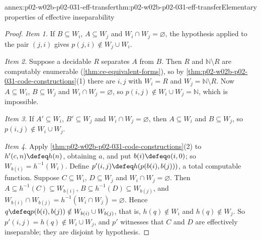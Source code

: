 \begin{annexitem}{annex:p02-w02b-p02-031-eff-transfer}{thm:p02-w02b-p02-031-eff-transfer}{Elementary properties of effective inseparability}
\begin{proof}
\emph{Item 1.}  If \(B\subseteq W_i\), \(A\subseteq W_j\) and \(W_i\cap
W_j=\varnothing\), the hypothesis applied to the pair \((j,i)\) gives
\(p(j,i)\notin W_j\cup W_i\).

\emph{Item 2.}  Suppose a decidable \(R\) separates \(A\) from \(B\).  Then
\(R\) and \(\mathbb N\setminus R\) are computably enumerable
(\cref{thm:ce-equivalent-forms}), so by
\cref{thm:p02-w02b-p02-031-code-constructions}(1) there are \(i,j\) with
\(W_i=R\) and \(W_j=\mathbb N\setminus R\).  Now \(A\subseteq W_i\),
\(B\subseteq W_j\) and \(W_i\cap W_j=\varnothing\), so
\(p(i,j)\notin W_i\cup W_j=\mathbb N\), which is impossible.

\emph{Item 3.}  If \(A'\subseteq W_i\), \(B'\subseteq W_j\) and \(W_i\cap
W_j=\varnothing\), then \(A\subseteq W_i\) and \(B\subseteq W_j\), so
\(p(i,j)\notin W_i\cup W_j\).

\emph{Item 4.}  Apply \cref{thm:p02-w02b-p02-031-code-constructions}(2) to
\(h'(c,n)\defeq h(n)\), obtaining \(a\), and put \(b(i)\defeq a(i,0)\); so
\(W_{b(i)}=h^{-1}(W_i)\).  Define \(p'(i,j)\defeq h(p(b(i),b(j)))\), a total
computable function.  Suppose \(C\subseteq W_i\), \(D\subseteq W_j\) and
\(W_i\cap W_j=\varnothing\).  Then \(A\subseteq h^{-1}(C)\subseteq W_{b(i)}\),
\(B\subseteq h^{-1}(D)\subseteq W_{b(j)}\), and
\(W_{b(i)}\cap W_{b(j)}=h^{-1}(W_i\cap W_j)=\varnothing\).  Hence
\(q\defeq p(b(i),b(j))\notin W_{b(i)}\cup W_{b(j)}\), that is, \(h(q)\notin
W_i\) and \(h(q)\notin W_j\).  So \(p'(i,j)=h(q)\notin W_i\cup W_j\), and
\(p'\) witnesses that \(C\) and \(D\) are effectively inseparable; they are
disjoint by hypothesis.
\end{proof}
\end{annexitem}

